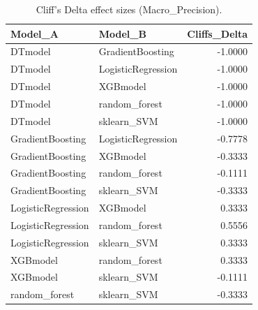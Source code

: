 \begin{table}[t]
\centering
\begin{tabular}{llr}
\toprule
Model_A & Model_B & Cliffs_Delta \\
\midrule
DTmodel & GradientBoosting & -1.0000 \\
DTmodel & LogisticRegression & -1.0000 \\
DTmodel & XGBmodel & -1.0000 \\
DTmodel & random_forest & -1.0000 \\
DTmodel & sklearn_SVM & -1.0000 \\
GradientBoosting & LogisticRegression & -0.7778 \\
GradientBoosting & XGBmodel & -0.3333 \\
GradientBoosting & random_forest & -0.1111 \\
GradientBoosting & sklearn_SVM & -0.3333 \\
LogisticRegression & XGBmodel & 0.3333 \\
LogisticRegression & random_forest & 0.5556 \\
LogisticRegression & sklearn_SVM & 0.3333 \\
XGBmodel & random_forest & 0.3333 \\
XGBmodel & sklearn_SVM & -0.1111 \\
random_forest & sklearn_SVM & -0.3333 \\
\bottomrule
\end{tabular}
\caption{Cliff's Delta effect sizes (Macro_Precision).}
\label{tab:cliffs_Macro_Precision}
\end{table}